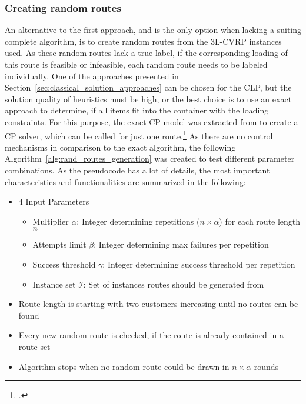 \subsubsection{Creating random routes}
An alternative to the first approach, and is the only option when lacking a suiting complete algorithm, is to
create random routes from the \gls{3L-CVRP} instances used. As these random routes lack
a true label, if the corresponding loading of this route is feasible or infeasible, each random
route needs to be labeled individually. One of the approaches presented in Section~\ref{sec:classical_solution_approaches} can be chosen
for the \gls{CLP}, but the solution quality of heuristics must be high, or the best choice is to
use an exact approach to determine, if all items fit into the container with the loading constraints.
For this purpose, the exact \gls{CP} model was extracted from \cite{tamke_repository_2024} to create
a \gls{CP} solver, which can be called for just one route.\footcite[Stolen with permission from][]{tamke_repository_2024}
As there are no control mechanisms in comparison to the exact algorithm, the
following Algorithm~\ref{alg:rand_routes_generation} was created to test different parameter
combinations. As the pseudocode has a lot of details, the most important characteristics and
functionalities are summarized in the following:

\begin{itemize}
    \item 4 Input Parameters
          \begin{itemize}
              \item Multiplier $\alpha$: Integer determining repetitions ($n\times\alpha$) for each route length $n$
              \item  Attempts limit $\beta$: Integer determining max failures per repetition
              \item  Success threshold $\gamma$: Integer determining success threshold per repetition
              \item Instance set $\mathcal{I}$: Set of instances routes should be generated from
          \end{itemize}
    \item Route length is starting with two customers increasing until no routes can be found
    \item Every new random route is checked, if the route is already contained in a route set
    \item Algorithm stops when no random route could be drawn in $n \times \alpha$ rounds
\end{itemize}

